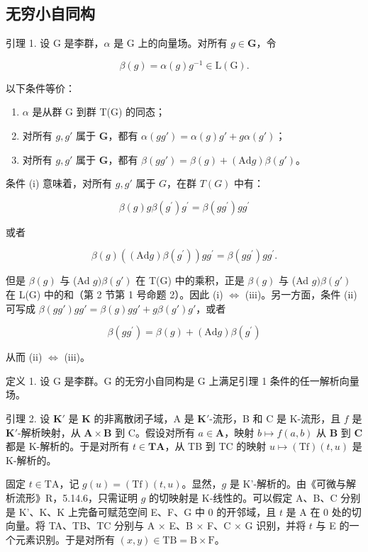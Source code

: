 \subsection{无穷小自同构}

引理 1. 设 G 是李群，\(\alpha\) 是 G 上的向量场。对所有 \(g \in \mathbf{G}\)，令

\[
\beta (g) = \alpha (g) g ^ {- 1} \in \mathrm{L} (\mathrm{G}).
\]

以下条件等价：

\begin{enumerate}
\def\labelenumi{(\roman{enumi})}
\item
  \(\alpha\) 是从群 G 到群 T(G) 的同态；
\item
  对所有 \(g, g'\) 属于 \(\mathbf{G}\)，都有 \(\alpha(gg') = \alpha(g)g' + g\alpha(g')\)；
\item
  对所有 \(g, g'\) 属于 \(\mathbf{G}\)，都有 \(\beta(gg') = \beta(g) + (\mathrm{Ad}g)\beta(g')\)。
\end{enumerate}

条件 (i) 意味着，对所有 \(g, g'\) 属于 \(G\)，在群 \(T(G)\) 中有：

\[
\beta (g) g \beta (g ^ {\prime}) g ^ {\prime} = \beta (g g ^ {\prime}) g g ^ {\prime}
\]

或者

\[
\beta (g) ((\mathrm{Ad} g) \beta (g ^ {\prime})) g g ^ {\prime} = \beta (g g ^ {\prime}) g g ^ {\prime}.
\]

但是 \(\beta(g)\) 与 (Ad \(g)\beta(g')\) 在 T(G) 中的乘积，正是 \(\beta(g)\) 与 (Ad \(g)\beta(g')\) 在 L(G) 中的和（第 2 节第 1 号命题 2）。因此 (i) \(\Leftrightarrow\) (iii)。另一方面，条件 (ii) 可写成 \(\beta(gg')gg' = \beta(g)gg' + g\beta(g')g'\)，或者

\[
\beta (g g ^ {\prime}) = \beta (g) + (\mathrm{Ad} g) \beta (g ^ {\prime})
\]

从而 (ii) \(\Leftrightarrow\) (iii)。

定义 1. 设 G 是李群。G 的无穷小自同构是 G 上满足引理 1 条件的任一解析向量场。

引理 2. 设 \(\mathbf{K}'\) 是 \(\mathbf{K}\) 的非离散闭子域，A 是 \(\mathbf{K}'\)-流形，B 和 C 是 K-流形，且 \(f\) 是 \(\mathbf{K}'\)-解析映射，从 \(\mathbf{A} \times \mathbf{B}\) 到 C。假设对所有 \(a \in \mathbf{A}\)，映射 \(b \mapsto f(a, b)\) 从 \(\mathbf{B}\) 到 \(\mathbf{C}\) 都是 K-解析的。于是对所有 \(t \in \mathbf{TA}\)，从 TB 到 TC 的映射 \(u \mapsto (\mathrm{Tf})(t, u)\) 是 K-解析的。

固定 \(t \in \mathrm{TA}\)，记 \(g(u) = (\mathrm{Tf})(t,u)\)。显然，\(g\) 是 K'-解析的。由《可微与解析流形》R，5.14.6，只需证明 \(g\) 的切映射是 K-线性的。可以假定 A、B、C 分别是 K'、K、K 上完备可赋范空间 E、F、G 中 0 的开邻域，且 \(t\) 是 A 在 0 处的切向量。将 TA、TB、TC 分别与 A × E、B × F、C × G 识别，并将 \(t\) 与 E 的一个元素识别。于是对所有 \((x,y) \in \mathrm{TB} = \mathrm{B} \times \mathrm{F}\)。

